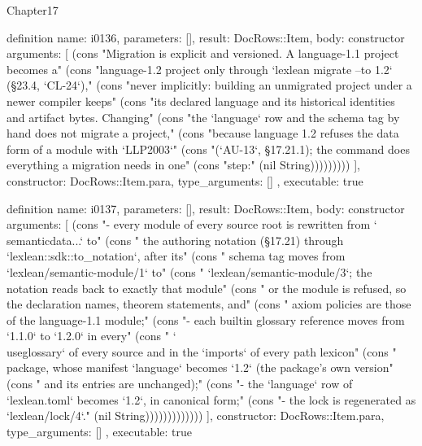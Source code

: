 \begin{lexlean}{Chapter17}
\begin{semanticmodule}
definition{
  name: i0136,
  parameters: [],
  result: DocRows::Item,
  body: constructor{
    arguments: [
      (cons "Migration is explicit and versioned. A language-1.1 project becomes a" (cons "language-1.2 project only through `lexlean migrate --to 1.2` (§23.4, `CL-24`)," (cons "never implicitly: building an unmigrated project under a newer compiler keeps" (cons "its declared language and its historical identities and artifact bytes. Changing" (cons "the `language` row and the schema tag by hand does not migrate a project," (cons "because language 1.2 refuses the data form of a module with `LLP2003`" (cons "(`AU-13`, §17.21.1); the command does everything a migration needs in one" (cons "step:" (nil String)))))))))
    ],
    constructor: DocRows::Item.para,
    type_arguments: []
  },
  executable: true
}

definition{
  name: i0137,
  parameters: [],
  result: DocRows::Item,
  body: constructor{
    arguments: [
      (cons "- every module of every source root is rewritten from `\\semanticdata{...}` to" (cons "  the authoring notation (§17.21) through `lexlean::sdk::to_notation`, after its" (cons "  schema tag moves from `lexlean/semantic-module/1` to" (cons "  `lexlean/semantic-module/3`; the notation reads back to exactly that module" (cons "  or the module is refused, so the declaration names, theorem statements, and" (cons "  axiom policies are those of the language-1.1 module;" (cons "- each builtin glossary reference moves from `1.1.0` to `1.2.0` in every" (cons "  `\\useglossary` of every source and in the `imports` of every path lexicon" (cons "  package, whose manifest `language` becomes `1.2` (the package's own version" (cons "  and its entries are unchanged);" (cons "- the `language` row of `lexlean.toml` becomes `1.2`, in canonical form;" (cons "- the lock is regenerated as `lexlean/lock/4`." (nil String)))))))))))))
    ],
    constructor: DocRows::Item.para,
    type_arguments: []
  },
  executable: true
}


\end{semanticmodule}
\end{lexlean}
